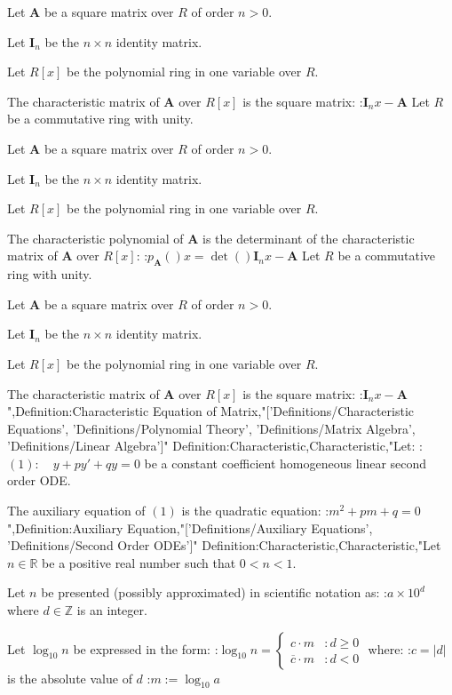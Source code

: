 Let $\mathbf A$ be a square matrix over $R$ of order $n > 0$.

Let $\mathbf I_n$ be the $n \times n$ identity matrix.

Let $R \left[ x \right]$ be the polynomial ring in one variable over $R$.


The characteristic matrix of $\mathbf A$ over $R \left[ x \right]$ is the square matrix:
:$\mathbf I_n x - \mathbf A$
Let $R$ be a commutative ring with unity.

Let $\mathbf A$ be a square matrix over $R$ of order $n > 0$.

Let $\mathbf I_n$ be the $n \times n$ identity matrix.

Let $R \left[ x \right]$ be the polynomial ring in one variable over $R$.


The characteristic polynomial of $\mathbf A$ is the determinant of the characteristic matrix of $\mathbf A$ over $R \left[ x \right]$:
:$p_{\mathbf A}  \left(   \right)x = \det \left(   \right){\mathbf I_n x - \mathbf A}$
Let $R$ be a commutative ring with unity.

Let $\mathbf A$ be a square matrix over $R$ of order $n > 0$.

Let $\mathbf I_n$ be the $n \times n$ identity matrix.

Let $R \left[ x \right]$ be the polynomial ring in one variable over $R$.


The characteristic matrix of $\mathbf A$ over $R \left[ x \right]$ is the square matrix:
:$\mathbf I_n x - \mathbf A$
",Definition:Characteristic Equation of Matrix,"['Definitions/Characteristic Equations', 'Definitions/Polynomial Theory', 'Definitions/Matrix Algebra', 'Definitions/Linear Algebra']"
Definition:Characteristic,Characteristic,"Let:
:$(1): \quad y + p y' + q y = 0$
be a constant coefficient homogeneous linear second order ODE.


The auxiliary equation of $(1)$ is the quadratic equation:
:$m^2 + p m + q = 0$",Definition:Auxiliary Equation,"['Definitions/Auxiliary Equations', 'Definitions/Second Order ODEs']"
Definition:Characteristic,Characteristic,"Let $n \in \mathbb R$ be a positive real number such that $0 < n < 1$.

Let $n$ be presented (possibly approximated) in scientific notation as:
:$a \times 10^d$
where $d \in \mathbb Z$ is an integer.


Let $\log_{10} n$ be expressed in the form:
:$\log_{10} n = \begin {cases} c \cdotp m & : d \ge 0 \\ \overline c \cdotp m & : d < 0 \end {cases}$
where:
:$c = \left\lvert d \right\rvert$ is the absolute value of $d$
:$m := \log_{10} a$


